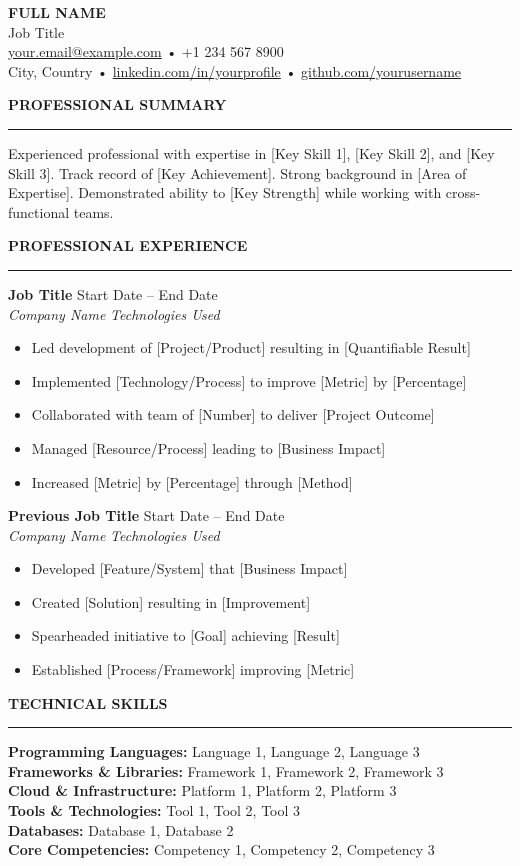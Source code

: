 \documentclass[11pt,a4paper]{article}
\newcommand{\resumeSection}[1]{
  \vspace{2mm}
  {\large\textbf{#1}}
  \vspace{1mm}
  \hrule
  \vspace{1mm}
}
\newcommand{\roleHeader}[4]{
  \textbf{#1} \hfill #2 \\
  \textit{#3} \hfill \textit{#4}
}
\begin{document}
\begin{center}
{\Large\textbf{FULL NAME}}\\
\vspace{1mm}
Job Title\\
\vspace{1mm}
\href{mailto:your.email@example.com}{your.email@example.com} • +1 234 567 8900\\
City, Country • \href{https://linkedin.com/in/yourprofile}{linkedin.com/in/yourprofile} • \href{https://github.com/yourusername}{github.com/yourusername}
\end{center}

\resumeSection{PROFESSIONAL SUMMARY}
Experienced professional with expertise in [Key Skill 1], [Key Skill 2], and [Key Skill 3]. Track record of [Key Achievement]. Strong background in [Area of Expertise]. Demonstrated ability to [Key Strength] while working with cross-functional teams.

\resumeSection{PROFESSIONAL EXPERIENCE}
\roleHeader{Job Title}{Start Date -- End Date}{Company Name}{Technologies Used}
\begin{itemize}[nosep,leftmargin=*]
  \item Led development of [Project/Product] resulting in [Quantifiable Result]
  \item Implemented [Technology/Process] to improve [Metric] by [Percentage]
  \item Collaborated with team of [Number] to deliver [Project Outcome]
  \item Managed [Resource/Process] leading to [Business Impact]
  \item Increased [Metric] by [Percentage] through [Method]
\end{itemize}

\roleHeader{Previous Job Title}{Start Date -- End Date}{Company Name}{Technologies Used}
\begin{itemize}[nosep,leftmargin=*]
  \item Developed [Feature/System] that [Business Impact]
  \item Created [Solution] resulting in [Improvement]
  \item Spearheaded initiative to [Goal] achieving [Result]
  \item Established [Process/Framework] improving [Metric]
\end{itemize}

\resumeSection{TECHNICAL SKILLS}
\textbf{Programming Languages:} Language 1, Language 2, Language 3\\
\textbf{Frameworks \& Libraries:} Framework 1, Framework 2, Framework 3\\
\textbf{Cloud \& Infrastructure:} Platform 1, Platform 2, Platform 3\\
\textbf{Tools \& Technologies:} Tool 1, Tool 2, Tool 3\\
\textbf{Databases:} Database 1, Database 2\\
\textbf{Core Competencies:} Competency 1, Competency 2, Competency 3
\end{document}
